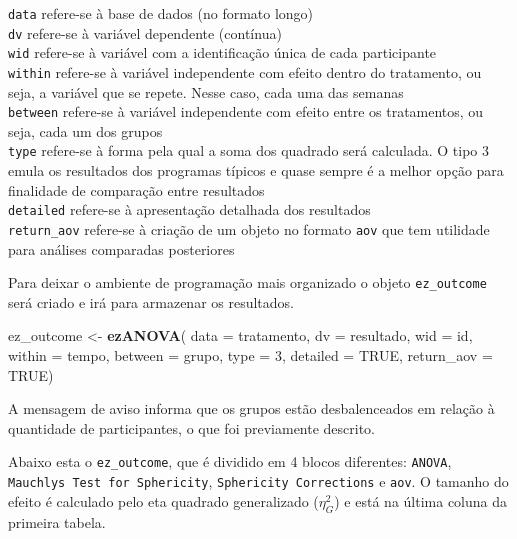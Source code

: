 \documentclass[
]{book}
\newenvironment{Shaded}{\begin{snugshade}}{\end{snugshade}}
\newcommand{\DataTypeTok}[1]{\textcolor[rgb]{0.13,0.29,0.53}{#1}}
\newcommand{\DecValTok}[1]{\textcolor[rgb]{0.00,0.00,0.81}{#1}}
\newcommand{\KeywordTok}[1]{\textcolor[rgb]{0.13,0.29,0.53}{\textbf{#1}}}
\newcommand{\NormalTok}[1]{#1}
\newcommand{\OtherTok}[1]{\textcolor[rgb]{0.56,0.35,0.01}{#1}}
\newcommand{\StringTok}[1]{\textcolor[rgb]{0.31,0.60,0.02}{#1}}
\begin{document}
\texttt{data} refere-se à base de dados (no formato longo)\\
\texttt{dv} refere-se à variável dependente (contínua)\\
\texttt{wid} refere-se à variável com a identificação única de cada participante\\
\texttt{within} refere-se à variável independente com efeito dentro do tratamento, ou seja, a variável que se repete. Nesse caso, cada uma das semanas\\
\texttt{between} refere-se à variável independente com efeito entre os tratamentos, ou seja, cada um dos grupos\\
\texttt{type} refere-se à forma pela qual a soma dos quadrado será calculada. O tipo 3 emula os resultados dos programas típicos e quase sempre é a melhor opção para finalidade de comparação entre resultados\\
\texttt{detailed} refere-se à apresentação detalhada dos resultados\\
\texttt{return\_aov} refere-se à criação de um objeto no formato \texttt{aov} que tem utilidade para análises comparadas posteriores

Para deixar o ambiente de programação mais organizado o objeto \texttt{ez\_outcome} será criado e irá para armazenar os resultados.

\begin{Shaded}
\begin{Highlighting}[]
\NormalTok{ez_outcome <-}\StringTok{ }\KeywordTok{ezANOVA}\NormalTok{(}
  \DataTypeTok{data =}\NormalTok{ tratamento,}
  \DataTypeTok{dv =}\NormalTok{ resultado,}
  \DataTypeTok{wid =}\NormalTok{ id,}
  \DataTypeTok{within =}\NormalTok{ tempo,}
  \DataTypeTok{between =}\NormalTok{ grupo,}
  \DataTypeTok{type =} \DecValTok{3}\NormalTok{,}
  \DataTypeTok{detailed =} \OtherTok{TRUE}\NormalTok{,}
  \DataTypeTok{return_aov =} \OtherTok{TRUE}\NormalTok{)}
\end{Highlighting}
\end{Shaded}

A mensagem de aviso informa que os grupos estão desbalenceados em relação à quantidade de participantes, o que foi previamente descrito.

Abaixo esta o \texttt{ez\_outcome}, que é dividido em 4 blocos diferentes: \texttt{ANOVA}, \texttt{Mauchly\textquotesingle{}s\ Test\ for\ Sphericity}, \texttt{Sphericity\ Corrections} e \texttt{aov}. O tamanho do efeito é calculado pelo eta quadrado generalizado (\(\eta^2_G\)) e está na última coluna da primeira tabela.
\end{document}
